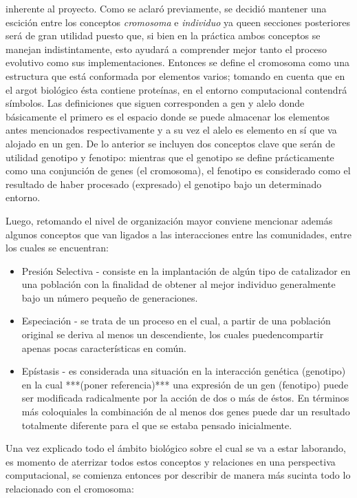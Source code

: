 \documentclass[class=report, crop=false]{standalone}
\begin{document}
inherente al proyecto.\break
Como se aclaró previamente, se decidió mantener una escición
entre los conceptos \textit{cromosoma} e \textit{individuo} 
ya queen secciones posteriores será de gran utilidad puesto que, 
si bien en la práctica ambos conceptos se manejan indistintamente, 
esto ayudará a comprender mejor tanto el proceso evolutivo como 
sus implementaciones.\medskip\break
Entonces se define el cromosoma como una estructura que está 
conformada por elementos varios; tomando en cuenta que en el 
argot biológico ésta contiene proteínas, en el entorno computacional 
contendrá símbolos. Las definiciones que siguen corresponden 
a gen y alelo donde básicamente el primero es el espacio donde 
se puede almacenar los elementos antes mencionados respectivamente 
y a su vez el alelo es elemento en sí que va alojado en un gen.\medskip\break  
De lo anterior se incluyen dos conceptos clave que serán de utilidad 
genotipo y fenotipo: mientras que el genotipo se define prácticamente 
como una conjunción de genes (el cromosoma), el fenotipo es considerado 
como el resultado de haber procesado (expresado) el genotipo bajo un 
determinado entorno.

Luego, retomando el nivel de organización mayor conviene 
mencionar además algunos conceptos que van ligados a las 
interacciones entre las comunidades, entre los cuales se encuentran:

\begin{itemize}
\item Presión Selectiva - consiste en la implantación de algún 
tipo de catalizador en una población con la finalidad de obtener al 
mejor individuo generalmente bajo un número pequeño de generaciones. 
\item Especiación - se trata de un proceso en el cual, a partir de 
una población original se deriva al menos un descendiente, los cuales 
puedencompartir apenas pocas características en común. 
\item Epístasis - es considerada una situación en la interacción 
genética (genotipo) en la cual ***(poner referencia)*** una expresión 
de un gen (fenotipo) puede ser modificada radicalmente por la acción 
de dos o más de éstos. En términos más coloquiales la combinación de 
al menos dos genes puede dar un resultado totalmente diferente para 
el que se estaba pensado inicialmente. 
\end{itemize}

Una vez explicado todo el ámbito biológico sobre el cual se va a 
estar laborando, es momento de aterrizar todos estos conceptos 
y relaciones en una perspectiva computacional, se comienza entonces 
por describir de manera más sucinta todo lo relacionado con el 
cromosoma:
\end{document}
